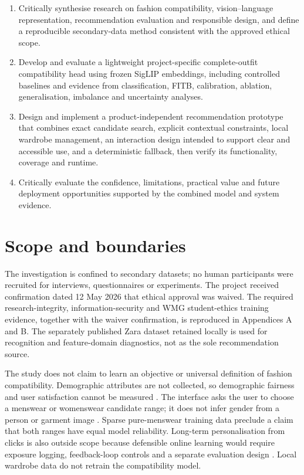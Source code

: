 \begin{enumerate}[label=\textbf{O\arabic*.}]
  \item Critically synthesise research on fashion compatibility,
        vision--language representation, recommendation evaluation and
        responsible design, and define a reproducible secondary-data method
        consistent with the approved ethical scope.
  \item Develop and evaluate a lightweight project-specific complete-outfit
        compatibility head
        using frozen SigLIP embeddings, including controlled baselines and
        evidence from classification, FITB, calibration, ablation,
        generalisation, imbalance and uncertainty analyses.
  \item Design and implement a product-independent recommendation prototype
        that combines exact candidate search, explicit contextual constraints,
        local wardrobe management, an interaction design intended to support
        clear and accessible use, and a
        deterministic fallback, then verify its functionality, coverage and
        runtime.
  \item Critically evaluate the confidence, limitations, practical value and
        future deployment opportunities supported by the combined model and
        system evidence.
\end{enumerate}

\section{Scope and boundaries}

The investigation is confined to secondary datasets; no human participants
were recruited for interviews, questionnaires or experiments. The project
received confirmation dated 12 May 2026 that ethical approval was waived. The
required research-integrity, information-security and WMG student-ethics
training evidence, together with the waiver confirmation, is reproduced in
Appendices A and B. The separately published Zara dataset retained locally is
used for recognition and feature-domain diagnostics, not as the sole
recommendation source.

The study does not claim to learn an objective or universal definition of
fashion compatibility. Demographic attributes are not collected, so
demographic fairness and user satisfaction cannot be measured
\parencite{mehrabi2021bias,selbst2019fairness}. The interface
asks the user to choose a menswear or womenswear candidate range; it does not
infer gender from a person or garment image \parencite{keyes2018misgendering}.
Sparse pure-menswear training data
preclude a claim that both ranges have equal model reliability. Long-term
personalisation from clicks is also outside scope because defensible online
learning would require exposure logging, feedback-loop controls and a separate
evaluation design \parencite{chaney2018confounding}. Local wardrobe data do not
retrain the compatibility model.

